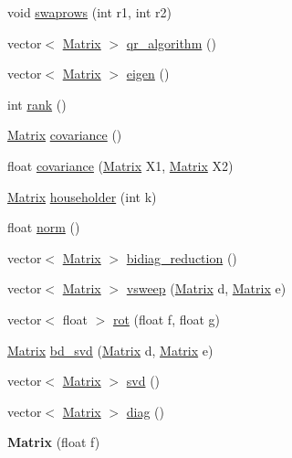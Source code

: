 \begin{DoxyCompactItemize}
\item 
void \hyperlink{classMatrix_a13a0253425eecc6f67fcba76f24e63f3}{swaprows} (int r1, int r2)
\item 
vector$<$ \hyperlink{classMatrix}{Matrix} $>$ \hyperlink{classMatrix_aa043ef91c612666ce8763ad3f28ef232}{qr\-\_\-algorithm} ()
\item 
vector$<$ \hyperlink{classMatrix}{Matrix} $>$ \hyperlink{classMatrix_a8240580696a5c5017f810ce946904730}{eigen} ()
\item 
int \hyperlink{classMatrix_aad7de0b382c1cc4e5a10b2c4ca714f2c}{rank} ()
\item 
\hyperlink{classMatrix}{Matrix} \hyperlink{classMatrix_a91abe2c33a0cd6295da4377c0a1bea9d}{covariance} ()
\item 
float \hyperlink{classMatrix_aa8c40cb197b8abf6dd77503390ef9a83}{covariance} (\hyperlink{classMatrix}{Matrix} X1, \hyperlink{classMatrix}{Matrix} X2)
\item 
\hyperlink{classMatrix}{Matrix} \hyperlink{classMatrix_affbdc3343469eec75044589915d9ef3a}{householder} (int k)
\item 
float \hyperlink{classMatrix_ae480a663270fc0256b5e26b008a987ae}{norm} ()
\item 
vector$<$ \hyperlink{classMatrix}{Matrix} $>$ \hyperlink{classMatrix_a19f1dfb4bfd711abac5487fa05411f65}{bidiag\-\_\-reduction} ()
\item 
vector$<$ \hyperlink{classMatrix}{Matrix} $>$ \hyperlink{classMatrix_a96a9a5233e3912174da180393fcf17c2}{vsweep} (\hyperlink{classMatrix}{Matrix} d, \hyperlink{classMatrix}{Matrix} e)
\item 
vector$<$ float $>$ \hyperlink{classMatrix_a5468976c6787cac696e4afa282e05ac2}{rot} (float f, float g)
\item 
\hyperlink{classMatrix}{Matrix} \hyperlink{classMatrix_a48622b7bcad32edee537151849ed1494}{bd\-\_\-svd} (\hyperlink{classMatrix}{Matrix} d, \hyperlink{classMatrix}{Matrix} e)
\item 
vector$<$ \hyperlink{classMatrix}{Matrix} $>$ \hyperlink{classMatrix_a11346edb7865f169cc6388527ddfbe82}{svd} ()
\item 
vector$<$ \hyperlink{classMatrix}{Matrix} $>$ \hyperlink{classMatrix_a9d085a163003a9e40d88751c917cdd61}{diag} ()
\item 
\hypertarget{classMatrix_af93a263fe8352046f4dbefbb49f2585f}{{\bfseries Matrix} (float f)}\label{classMatrix_af93a263fe8352046f4dbefbb49f2585f}

\end{DoxyCompactItemize}


